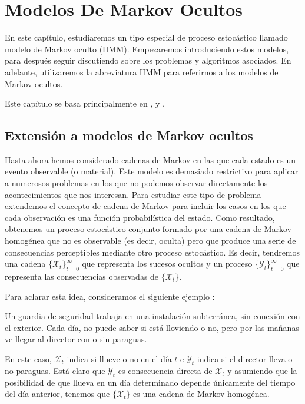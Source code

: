 \chapter{Modelos De Markov Ocultos}

En este capítulo, estudiaremos un tipo especial de proceso estocástico llamado modelo de Markov oculto (HMM). Empezaremos introduciendo estos modelos, para después seguir discutiendo sobre los problemas y algoritmos asociados. En adelante, utilizaremos la abreviatura HMM para referirnos a los modelos de Markov ocultos. 

Este capítulo se basa principalmente en \cite{Rabiner}, \cite[Capítulo 2]{Stamp} y \cite{Jurafsky}.
\section{Extensión a modelos de Markov ocultos }
Hasta ahora hemos considerado cadenas de Markov en las que cada estado es un evento observable (o material). Este modelo es demasiado restrictivo para aplicar a numerosos problemas en los que no podemos observar directamente los acontecimientos que nos interesan. Para estudiar este tipo de problema extendemos el concepto de cadena de Markov para incluir los casos en los que cada observación es una función probabilística del estado. Como resultado, obtenemos un proceso estocástico conjunto formado por una cadena de Markov homogénea que no es observable (es decir, oculta) pero que produce una serie de consecuencias perceptibles mediante otro proceso estocástico. Es decir, tendremos una cadena $\{\mathcal{X}_t\}_{t=0}^{\infty}$ que representa los sucesos ocultos y un proceso $\{\mathcal{Y}_t\}_{t=0}^{\infty}$ que representa las consecuencias observadas de $\{\mathcal{X}_t\}$. 

Para aclarar esta idea, consideramos el siguiente ejemplo \cite{Russell}:
\begin{exampleth}\label{ejemplo_paraguas}
Un guardia de seguridad trabaja en una instalación subterránea, sin conexión con el exterior. Cada día, no puede saber si está lloviendo o no, pero por las mañanas ve llegar al director con o sin paraguas.

En este caso, $\mathcal{X}_t$ indica si llueve o no en el día $t$ e $\mathcal{Y}_t$ indica si el director lleva o no paraguas. Está claro que $\mathcal{Y}_t$ es consecuencia directa de $\mathcal{X}_t$ y asumiendo que la posibilidad de que llueva en un día determinado depende únicamente del tiempo del día anterior, tenemos que $\{\mathcal{X}_t\}$ es una cadena de Markov homogénea.
\end{exampleth}

